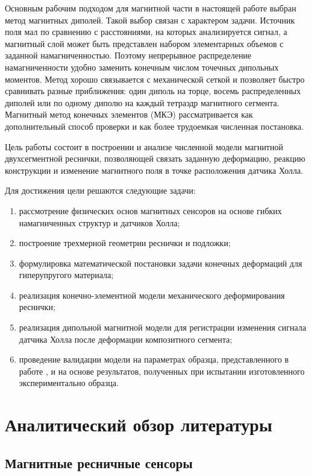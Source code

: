 \documentclass[14pt,a4paper]{extarticle}
\newcommand{\numberedsection}[1]{%
    \clearpage
    \section{#1}%
}
\begin{document}
Основным рабочим подходом для магнитной части в настоящей работе выбран метод магнитных диполей. Такой выбор связан с характером задачи. Источник поля мал по сравнению с расстояниями, на которых анализируется сигнал, а магнитный слой может быть представлен набором элементарных объемов с заданной намагниченностью. Поэтому непрерывное распределение намагниченности удобно заменить конечным числом точечных дипольных моментов. Метод хорошо связывается с механической сеткой и позволяет быстро сравнивать разные приближения: один диполь на торце, восемь распределенных диполей или по одному диполю на каждый тетраэдр магнитного сегмента. Магнитный метод конечных элементов (МКЭ) рассматривается как дополнительный способ проверки и как более трудоемкая численная постановка.

Цель работы состоит в построении и анализе численной модели магнитной двухсегментной реснички, позволяющей связать заданную деформацию, реакцию конструкции и изменение магнитного поля в точке расположения датчика Холла.

Для достижения цели решаются следующие задачи:
\begin{enumerate}
    \item рассмотрение физических основ магнитных сенсоров на основе гибких намагниченных структур и датчиков Холла;
    \item построение трехмерной геометрии реснички и подложки;
    \item формулировка математической постановки задачи конечных деформаций для гиперупругого материала;
    \item реализация конечно-элементной модели механического деформирования реснички;
    \item реализация дипольной магнитной модели для регистрации изменения сигнала датчика Холла после деформации композитного сегмента;
    \item проведение валидации модели на параметрах образца, представленного в работе \cite{man2023}, и на основе результатов, полученных при испытании изготовленного экспериментально образца.
\end{enumerate}



\numberedsection{Аналитический обзор литературы}

\subsection{Магнитные ресничные сенсоры}
\end{document}
